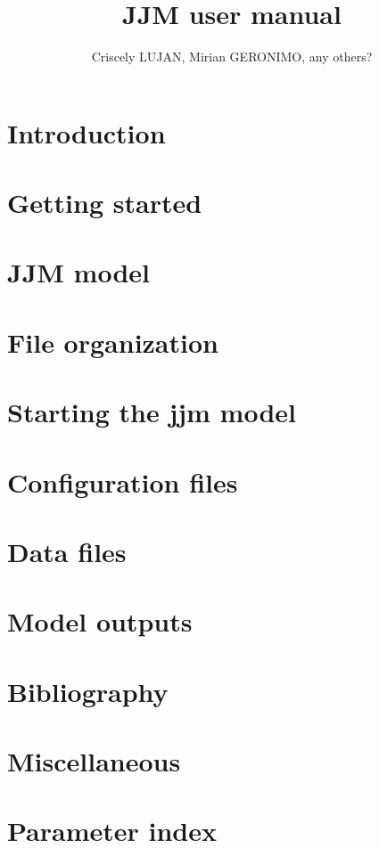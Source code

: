 \documentclass{article}
\title{JJM user manual}
\author{Criscely LUJAN, Mirian GERONIMO, any others?}
\begin{document}
\maketitle
\tableofcontents

\section{Introduction} 

\section{Getting started} 

\section{JJM model}

\section{File organization}

\section{Starting the jjm model}

\section{Configuration files}

\section{Data files}

\section{Model outputs}

\section{Bibliography}

\section{Miscellaneous}
\section{Parameter index}
\end{document}
